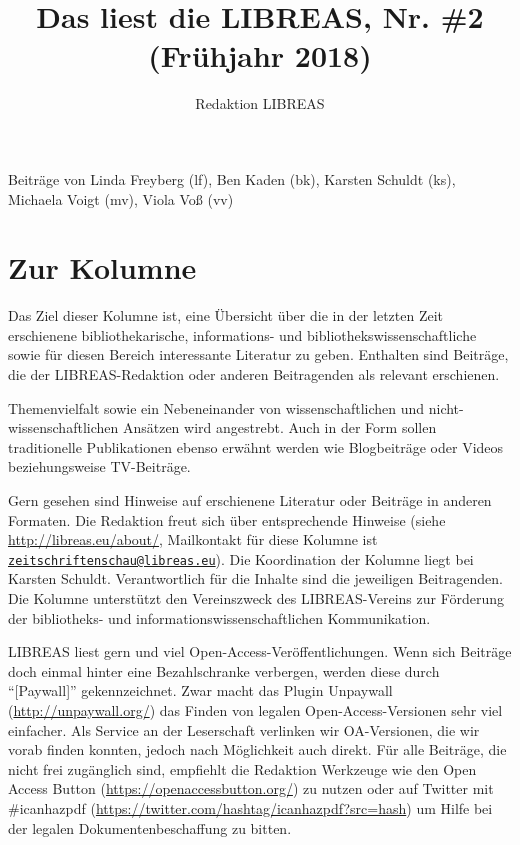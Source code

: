 \documentclass[a4paper,
fontsize=11pt,
oneside,
numbers=noperiodatend,
parskip=half-,
bibliography=totoc,
final
]{scrartcl}
\title{\LARGE{Das liest die LIBREAS, Nr. \#2 (Frühjahr 2018)}} %
\author{Redaktion LIBREAS} %
\date{}
\begin{document}
\maketitle
\thispagestyle{fancyplain} 


Beiträge von Linda Freyberg (lf), Ben Kaden (bk), Karsten Schuldt (ks),
Michaela Voigt (mv), Viola Voß (vv)

\hypertarget{zur-kolumne}{%
\section{Zur Kolumne}\label{zur-kolumne}}

Das Ziel dieser Kolumne ist, eine Übersicht über die in der letzten Zeit
erschienene bibliothekarische, informations- und
bibliothekswissenschaftliche sowie für diesen Bereich interessante
Literatur zu geben. Enthalten sind Beiträge, die der LIBREAS-Redaktion
oder anderen Beitragenden als relevant erschienen.

Themenvielfalt sowie ein Nebeneinander von wissenschaftlichen und
nicht-wissenschaftlichen Ansätzen wird angestrebt. Auch in der Form
sollen traditionelle Publikationen ebenso erwähnt werden wie
Blogbeiträge oder Videos beziehungsweise TV-Beiträge.

Gern gesehen sind Hinweise auf erschienene Literatur oder Beiträge in
anderen Formaten. Die Redaktion freut sich über entsprechende Hinweise
(siehe \url{http://libreas.eu/about/}, Mailkontakt für diese Kolumne ist
\href{mailto:zeitschriftenschau@libreas.eu}{\nolinkurl{zeitschriftenschau@libreas.eu}}).
Die Koordination der Kolumne liegt bei Karsten Schuldt. Verantwortlich
für die Inhalte sind die jeweiligen Beitragenden. Die Kolumne
unterstützt den Vereinszweck des LIBREAS-Vereins zur Förderung der
bibliotheks- und informationswissenschaftlichen Kommunikation.

LIBREAS liest gern und viel Open-Access-Veröffentlichungen. Wenn sich
Beiträge doch einmal hinter eine Bezahlschranke verbergen, werden diese
durch \enquote{{[}Paywall{]}} gekennzeichnet. Zwar macht das Plugin
Unpaywall (\url{http://unpaywall.org/}) das Finden von legalen
Open-Access-Versionen sehr viel einfacher. Als Service an der
Leserschaft verlinken wir OA-Versionen, die wir vorab finden konnten,
jedoch nach Möglichkeit auch direkt. Für alle Beiträge, die nicht frei
zugänglich sind, empfiehlt die Redaktion Werkzeuge wie den Open Access
Button (\url{https://openaccessbutton.org/}) zu nutzen oder auf Twitter
mit \#icanhazpdf (\url{https://twitter.com/hashtag/icanhazpdf?src=hash})
um Hilfe bei der legalen Dokumentenbeschaffung zu bitten.
\end{document}
